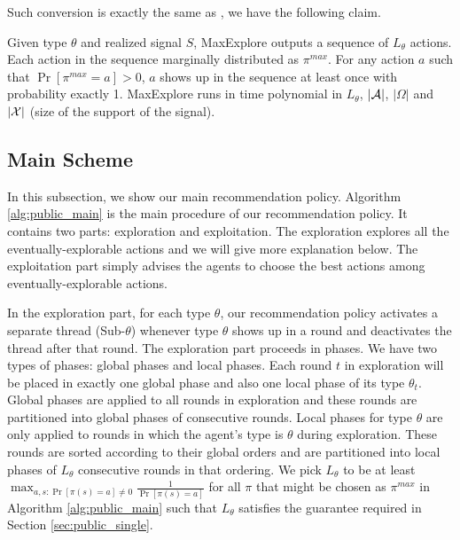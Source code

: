 Such conversion is exactly the same as \cite{ICexplorationGames-ec16-working}, we have the following claim.

\begin{claim}
\label{clm:maxexplore}
Given type $\theta$ and realized signal $S$, MaxExplore outputs a sequence of $L_{\theta}$ actions. 
Each action in the sequence marginally distributed as $\pi^{max}$. 
For any action $a$ such that $\Pr[\pi^{max} =a] >0$, $a$ shows up in the sequence at least once with probability exactly 1.
MaxExplore runs in time polynomial in $L_{\theta}$, $|\mathcal{A}|$, $|\varOmega|$ and $|\mathcal{X}|$ (size of the support of the signal).
\end{claim}

\subsection{Main Scheme}
\label{sec:public_main}
In this subsection, we show our main recommendation policy. Algorithm \ref{alg:public_main} is the main procedure of our recommendation policy. It contains two parts: exploration and exploitation. The exploration explores all the eventually-explorable actions and we will give more explanation below. The exploitation part simply advises the agents to choose the best actions among eventually-explorable actions. 

In the exploration part, for each type $\theta$, our recommendation policy activates a separate thread (Sub-$\theta$) whenever type $\theta$ shows up in a round and deactivates the thread after that round. The exploration part proceeds in phases. We have two types of phases: global phases and local phases. Each round $t$ in exploration will be placed in exactly one global phase and also one local phase of its type $\theta_t$. Global phases are applied to all rounds in exploration and these rounds are partitioned into global phases of consecutive rounds. Local phases for type $\theta$ are only applied to rounds in which the agent's type is $\theta$ during exploration. These rounds are sorted according to their global orders and are partitioned into local phases of $L_\theta$ consecutive rounds in that ordering. We pick $L_{\theta}$ to be at least $\max_{a,s: \Pr[\pi(s)=a] \neq 0} \frac{1}{\Pr[\pi(s)=a]}$ for all $\pi$ that might be chosen as $\pi^{max}$ in Algorithm \ref{alg:public_main} such that $L_{\theta}$ satisfies the guarantee required in Section \ref{sec:public_single}.

